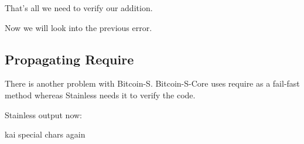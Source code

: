 \documentclass[runningheads]{llncs}
\newcommand{\todo}[1]{{\par \color{red}#1}}
\begin{document}
That's all we need to verify our addition.

Now we will look into the previous error.


\subsection{Propagating Require}

There is another problem with Bitcoin-S.
Bitcoin-S-Core uses require as a fail-fast method whereas Stainless needs it to verify the code.

Stainless output now: \todo{kai special chars again}
\end{document}

